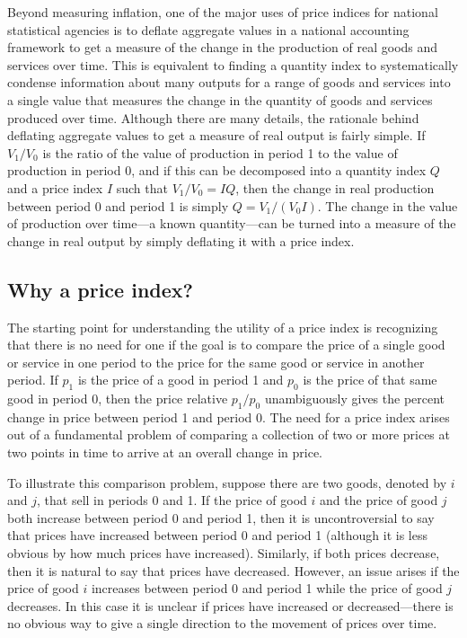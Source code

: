 \documentclass[
]{article}
\begin{document}
Beyond measuring inflation, one of the major uses of price indices for national statistical agencies is to deflate aggregate values in a national accounting framework to get a measure of the change in the production of real goods and services over time. This is equivalent to finding a quantity index to systematically condense information about many outputs for a range of goods and services into a single value that measures the change in the quantity of goods and services produced over time. Although there are many details, the rationale behind deflating aggregate values to get a measure of real output is fairly simple. If \(V_1/V_0\) is the ratio of the value of production in period 1 to the value of production in period 0, and if this can be decomposed into a quantity index \(Q\) and a price index \(I\) such that \(V_1/V_0 = IQ\), then the change in real production between period 0 and period 1 is simply \(Q = V_1 / (V_0 I)\). The change in the value of production over time---a known quantity---can be turned into a measure of the change in real output by simply deflating it with a price index.

\hypertarget{why-a-price-index}{%
\subsection{Why a price index?}\label{why-a-price-index}}

The starting point for understanding the utility of a price index is recognizing that there is no need for one if the goal is to compare the price of a single good or service in one period to the price for the same good or service in another period. If \(p_1\) is the price of a good in period 1 and \(p_0\) is the price of that same good in period 0, then the price relative \(p_1/p_0\) unambiguously gives the percent change in price between period 1 and period 0. The need for a price index arises out of a fundamental problem of comparing a collection of two or more prices at two points in time to arrive at an overall change in price.

To illustrate this comparison problem, suppose there are two goods, denoted by \(i\) and \(j\), that sell in periods 0 and 1. If the price of good \(i\) and the price of good \(j\) both increase between period 0 and period 1, then it is uncontroversial to say that prices have increased between period 0 and period 1 (although it is less obvious by how much prices have increased). Similarly, if both prices decrease, then it is natural to say that prices have decreased. However, an issue arises if the price of good \(i\) increases between period 0 and
period 1 while the price of good \(j\) decreases. In this case it is unclear if prices have increased or decreased---there is no obvious way to give a single direction to the movement of prices over time.
\end{document}
